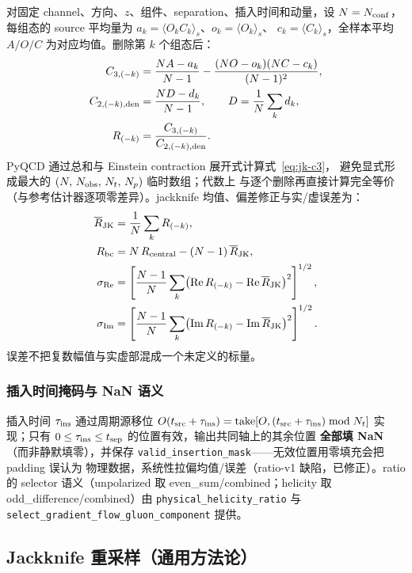 \documentclass[11pt,a4paper]{ctexart}
\newcommand{\code}[1]{\texttt{#1}}
\begin{document}
对固定 channel、方向、$z$、组件、separation、插入时间和动量，设
$N=N_{\rm conf}$，每组态的 source 平均量为
$a_k=\langle O_kC_k\rangle_s$、$o_k=\langle O_k\rangle_s$、
$c_k=\langle C_k\rangle_s$，全样本平均 $A/O/C$ 为对应均值。删除第 $k$
个组态后：
\begin{align}
C_{3,(-k)} &= \frac{NA-a_k}{N-1}
-\frac{(NO-o_k)(NC-c_k)}{(N-1)^2}, \label{eq:jk-c3}\\
C_{2,(-k),\rm den} &= \frac{ND-d_k}{N-1}, \qquad
D=\frac1N\sum_k d_k, \label{eq:jk-c2}\\
R_{(-k)} &= \frac{C_{3,(-k)}}{C_{2,(-k),\rm den}}. \label{eq:jk-ratio}
\end{align}
PyQCD 通过总和与 Einstein contraction 展开式计算式~\eqref{eq:jk-c3}，
避免显式形成最大的 $(N,\,N_{\rm obs},\,N_t,\,N_p)$ 临时数组；代数上
与逐个删除再直接计算完全等价（与参考估计器逐项零差异）。jackknife
均值、偏差修正与实/虚误差为：
\begin{align}
\overline R_{\rm JK} &= \frac1N\sum_k R_{(-k)}, \notag\\
R_{\rm bc} &= N\,R_{\rm central}-(N-1)\,\overline R_{\rm JK}, \notag\\
\sigma_{\rm Re} &= \left[\frac{N-1}{N}\sum_k
\bigl(\operatorname{Re}R_{(-k)}-\operatorname{Re}\overline R_{\rm JK}
\bigr)^2\right]^{1/2}, \notag\\
\sigma_{\rm Im} &= \left[\frac{N-1}{N}\sum_k
\bigl(\operatorname{Im}R_{(-k)}-\operatorname{Im}\overline R_{\rm JK}
\bigr)^2\right]^{1/2}. \label{eq:jk-errors}
\end{align}
误差不把复数幅值与实虚部混成一个未定义的标量。

\subsubsection{插入时间掩码与 NaN 语义}

插入时间 $\tau_{\rm ins}$ 通过周期源移位
$O(t_{\rm src}+\tau_{\rm ins})=\operatorname{take}[O,
(t_{\rm src}+\tau_{\rm ins})\bmod N_t]$ 实现；只有
$0\le\tau_{\rm ins}\le t_{\rm sep}$ 的位置有效，输出共同轴上的其余位置
\textbf{全部填 NaN}（而非静默填零），并保存
\code{valid\_insertion\_mask}——无效位置用零填充会把 padding 误认为
物理数据，系统性拉偏均值/误差（ratio-v1 缺陷，已修正）。ratio 的
selector 语义（unpolarized 取 even\_sum/combined；helicity 取
odd\_difference/combined）由 \code{physical\_helicity\_ratio} 与
\code{select\_gradient\_flow\_gluon\_component} 提供。

\subsection{Jackknife 重采样（通用方法论）}
\end{document}
